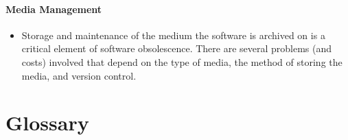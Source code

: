 \documentclass{report}
\begin{document}
		    \subsection{Media Management}
		    	\begin{itemize}
		    		\item Storage and maintenance of the medium the software is archived on is a critical element of software obsolescence.  There are several problems (and costs) involved that depend on the type of media, the method of storing the media, and version control.
		    	\end{itemize}
	
\part{Glossary}
\end{document}
